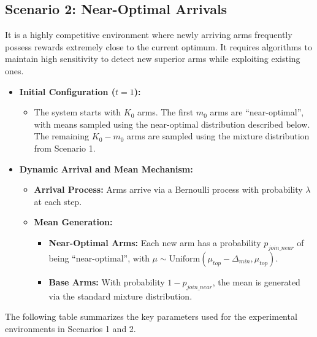 \documentclass[11pt]{article}
\begin{document}
\subsection{Scenario 2: Near-Optimal Arrivals}
 It is a highly competitive environment where newly arriving arms frequently possess rewards extremely close to the current optimum. It requires algorithms to maintain high sensitivity to detect new superior arms while exploiting existing ones.

\begin{itemize}
    \item \textbf{Initial Configuration ($t=1$):} 
    \begin{itemize}
        \item The system starts with $K_0$ arms. The first $m_0$ arms are ``near-optimal'', with means sampled using the near-optimal distribution described below. The remaining $K_0 - m_0$ arms are sampled using the mixture distribution from Scenario 1.
    \end{itemize}
    \item \textbf{Dynamic Arrival and Mean Mechanism:} 
    \begin{itemize}
        \item \textbf{Arrival Process:} Arms arrive via a Bernoulli process with probability $\lambda$ at each step.
        \item \textbf{Mean Generation:} 
        \begin{itemize}
            \item \textbf{Near-Optimal Arms:} Each new arm has a probability $p_{join\_near}$ of being ``near-optimal'', with $\mu \sim \text{Uniform}(\mu_{top} - \Delta_{min}, \mu_{top})$.
            \item \textbf{Base Arms:} With probability $1 - p_{join\_near}$, the mean is generated via the standard mixture distribution.

        \end{itemize}
    \end{itemize}
\end{itemize}


The following table summarizes the key parameters used for the experimental environments in Scenarios 1 and 2.
\end{document}
